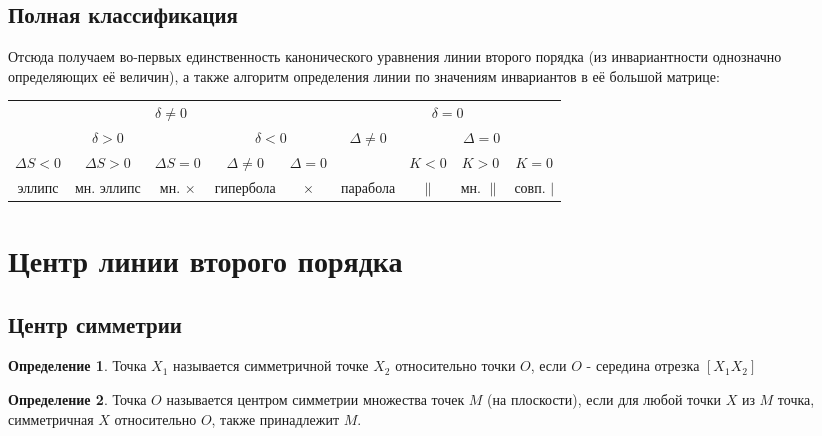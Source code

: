 \documentclass[a4paper, 12pt]{article}
\theoremstyle{definition}
\newtheorem*{definition}{Определение}
\begin{document}
	\subsection{Полная классификация}
	Отсюда получаем во-первых единственность канонического уравнения линии второго порядка (из инвариантности однозначно определяющих её величин), а также алгоритм определения линии по значениям инвариантов в её большой матрице:
	\begin{table}[htbp]
		\begin{tabular}{@{}ccccccccc@{}}
			\toprule
		\multicolumn{5}{c}{$\delta \neq 0$} & \multicolumn{4}{c}{$\delta = 0$} \\ \cmidrule(lr){1-5}\cmidrule(lr){6-9}
		\multicolumn{3}{c}{$\delta > 0$} & \multicolumn{2}{c}{$\delta < 0$} & $\Delta \neq 0$ & \multicolumn{3}{c}{$\Delta = 0$} \\ \cmidrule(lr){1-3}\cmidrule(lr){4-5}\cmidrule{7-9}
		$\Delta S < 0$ & $\Delta S > 0$ & $\Delta S = 0$ & $\Delta \neq 0$ & $\Delta = 0$ &  & $K < 0$ & $K > 0$ & $K = 0$ \\ \cmidrule(lr){1-1}\cmidrule(lr){2-2}\cmidrule{3-3}\cmidrule(lr){4-4}\cmidrule(lr){5-5}\cmidrule{6-6}\cmidrule(lr){7-7}\cmidrule(lr){8-8}\cmidrule{9-9}
		эллипс&мн. эллипс&мн. $\times$&гипербола&$\times$&парабола&$\parallel$&мн. $\parallel$& совп. $|$ \\\bottomrule
		\end{tabular}
	\end{table} 
	\section{Центр линии второго порядка}
	\subsection{Центр симметрии}
	\begin{definition}
		Точка $X_1$ называется симметричной точке $X_2$ относительно точки $O$, если $O$ - середина отрезка $[X_1 X_2]$
	\end{definition}
	\begin{definition}
		Точка $O$ называется центром симметрии множества точек $M$ (на плоскости), если для любой точки $X$ из $M$ точка, симметричная $X$ относительно $O$, также принадлежит $M$. 
	\end{definition}
\end{document}
